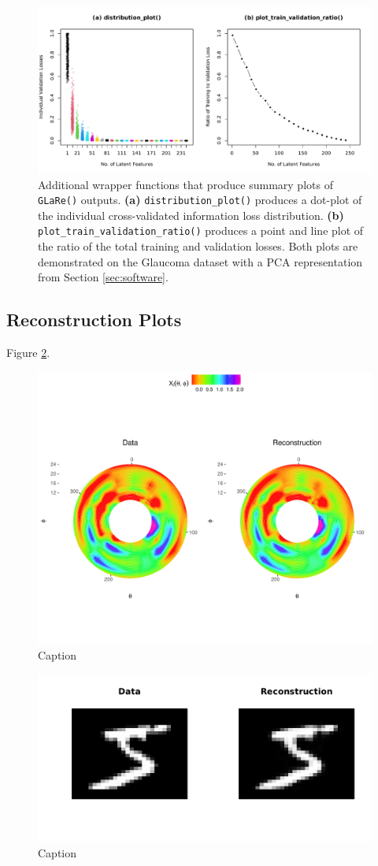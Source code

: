 \begin{figure}
    \centering
    \includegraphics[width=1\linewidth]{figures/additional-plots-01.pdf}
    \caption{Additional wrapper functions that produce summary plots of \texttt{GLaRe()} outputs. \textbf{(a)} \texttt{distribution\_plot()} produces a dot-plot of the individual cross-validated information loss distribution. \textbf{(b)} \texttt{plot\_train\_validation\_ratio()} produces a point and line plot of the ratio of the total training and validation losses.
    Both plots are demonstrated on the Glaucoma dataset with a PCA representation from Section \ref{sec:software}.}
    \label{fig:additional-plots-01}
\end{figure}

\subsection{Reconstruction Plots}

Figure \ref{fig:eye-reconstruction}.

\begin{figure}
    \centering
    \includegraphics[width=0.75\linewidth]{figures/eye-reconstruction.pdf}
    \caption{Caption}
    \label{fig:eye-reconstruction}
\end{figure}


\begin{figure}
    \centering
    \includegraphics[width=0.75\linewidth]{figures/mnist-reconstruction.pdf}
    \caption{Caption}
    \label{fig:mnist-reconstruction}
\end{figure}